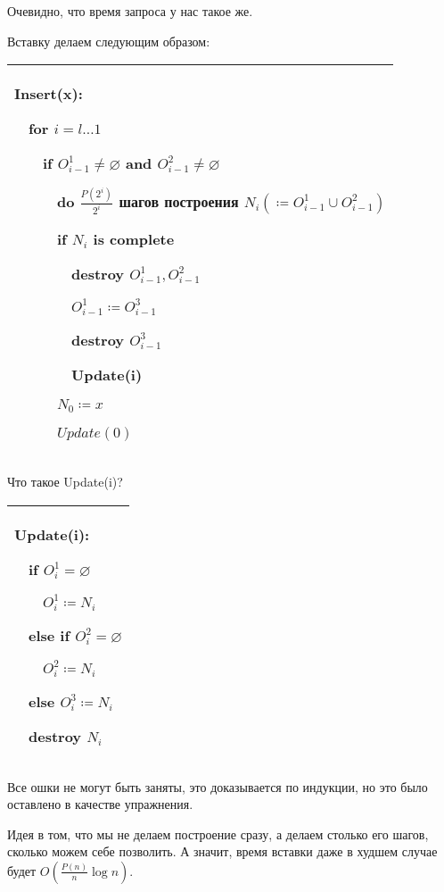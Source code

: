 Очевидно, что время запроса у нас такое же.

Вставку делаем следующим образом:

\begin{tabular}{|p{9cm}|}
\hline
Insert(x):

$\quad$for $i=l \ldots 1$

$\quad$$\quad$if $O^1_{i-1} \ne \varnothing$ and $O^2_{i-1} \ne \varnothing$

$\quad$$\quad$$\quad$do $\frac{P(2^i)}{2^i}$ шагов построения $N_i( \coloneqq O^1_{i-1}\cup O_{i-1}^2)$

$\quad$$\quad$$\quad$if $N_i$ is complete

$\quad$$\quad$$\quad$$\quad$destroy $O_{i-1}^1,O_{i-1}^2$

$\quad$$\quad$$\quad$$\quad$$O^1_{i-1} \coloneqq O_{i-1}^3$

$\quad$$\quad$$\quad$$\quad$destroy $O_{i-1}^3$


$\quad$$\quad$$\quad$$\quad$Update(i)

$\quad$$\quad$$\quad$$N_0 \coloneqq x$

$\quad$$\quad$$\quad$$Update(0)$\\

\hline
\end{tabular}

Что такое Update(i)?

\begin{tabular}{|p{3cm}|}
\hline
Update(i):

$\quad$if $O^1_i=\varnothing$

$\quad$$\quad$$O^1_i \coloneqq N_i$

$\quad$else if $O_i^2 = \varnothing$

$\quad$$\quad$$O_i^2 \coloneqq N_i$

$\quad$else $O_i^3 \coloneqq N_i$

$\quad$destroy $N_i$\\

\hline
\end{tabular}






Все ошки не могут быть заняты, это доказывается по индукции, но это было оставлено в качестве упражнения.

Идея в том, что мы не делаем построение сразу, а делаем столько его шагов, сколько можем себе позволить. А значит, время вставки даже в худшем случае будет $O\left(\frac{P(n)}{n}\log n\right)$.

